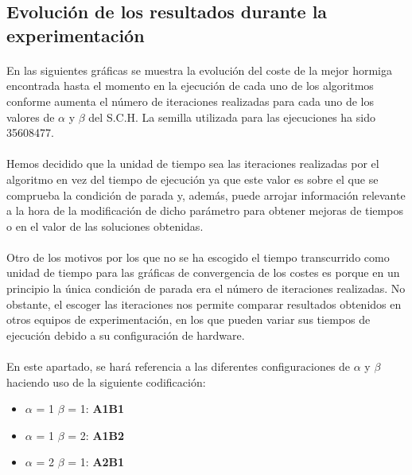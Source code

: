 	\subsection{Evolución de los resultados durante la experimentación}
	
	\paragraph{}En las siguientes gráficas se muestra la evolución del coste de la mejor hormiga encontrada hasta el momento en la ejecución de cada uno de los algoritmos conforme aumenta el número de iteraciones realizadas para cada uno de los valores de $\alpha$ y $\beta$ del S.C.H. La semilla utilizada para las ejecuciones ha sido 35608477.
	
	\paragraph{}Hemos decidido que la unidad de tiempo sea las iteraciones realizadas por el algoritmo en vez del tiempo de ejecución ya que este valor es sobre el que se comprueba la condición de parada y, además, puede arrojar información relevante a la hora de la modificación de dicho parámetro para obtener mejoras de tiempos o en el valor de las soluciones obtenidas.
	
	\paragraph{}Otro de los motivos por los que no se ha escogido el tiempo transcurrido como unidad de tiempo para las gráficas de convergencia de los costes es porque en un principio la única condición de parada era el número de iteraciones realizadas. No obstante, el escoger las iteraciones nos permite comparar resultados obtenidos en otros equipos de experimentación, en los que pueden variar sus tiempos de ejecución debido a su configuración de hardware.
	
	\paragraph{}En este apartado, se hará referencia a las diferentes configuraciones de $\alpha$ y $\beta$ haciendo uso de la siguiente codificación:
	
	\begin{itemize}
		\item$\alpha$ = 1 $\beta$ = 1: \textbf{A1B1}
		\item$\alpha$ = 1 $\beta$ = 2: \textbf{A1B2}
		\item$\alpha$ = 2 $\beta$ = 1: \textbf{A2B1}
	\end{itemize}
	
